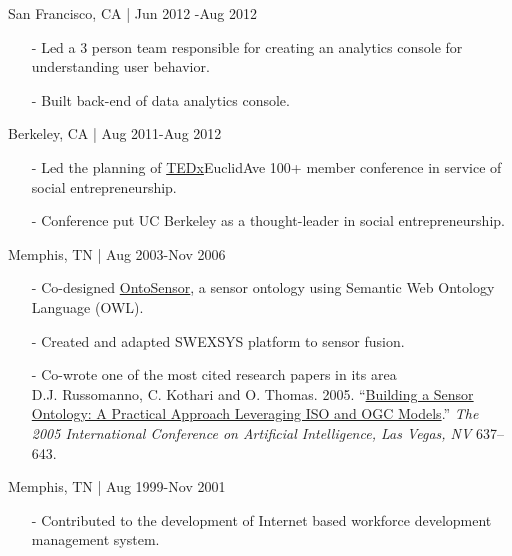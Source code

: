 \documentclass[10pt,article,oneside]{memoir}
\begin{document}
 \hfill San Francisco, CA | Jun 2012 -Aug 2012
\begin{itemize}[noitemsep,nolistsep]
\item[-]Led a 3 person team responsible for creating an analytics console for understanding user behavior.
\item[-]Built back-end of data analytics console.
\end{itemize} 

 \hfill Berkeley, CA | Aug 2011-Aug 2012
\begin{itemize}[noitemsep,nolistsep]
\item[-]Led the planning of \href{http://www.ted.com/tedx/events/3790}{TEDx}EuclidAve 100+ member conference in service of social entrepreneurship.
\item[-] Conference put UC Berkeley as a thought-leader in social entrepreneurship.
\end{itemize} 

 \hfill Memphis, TN | Aug 2003-Nov 2006
\begin{itemize}[noitemsep,nolistsep]
\item[-]Co-designed \href{https://scholar.google.com/scholar?hl=en&q=Building+a+Sensor+Ontology\%3A+A+Practical+Approach+Leveraging+ISO+and+OGC+Models.&btnG=&as_sdt=1\%2C43&as_sdtp=}{OntoSensor}, a sensor ontology using Semantic Web Ontology Language (OWL).
\item[-]Created and adapted SWEXSYS platform to sensor fusion.
\item[-]Co-wrote one of the most cited research papers in its area\\
\ind D.J. Russomanno, C. Kothari and O. Thomas. 2005. ``\href{https://scholar.google.com/citations?view_op=view_citation&hl=en&user=E7z_wrwAAAAJ&sortby=pubdate&citation_for_view=E7z_wrwAAAAJ:u5HHmVD_uO8C}{Building a Sensor Ontology: A Practical Approach Leveraging ISO and OGC Models}.'' \emph{The 2005 International Conference on Artificial Intelligence, Las Vegas, NV} 637--643. 
\end{itemize}

 \hfill Memphis, TN | Aug 1999-Nov 2001
\begin{itemize}[noitemsep,nolistsep]
\item[-]Contributed to the development of Internet based workforce development management system.
\end{itemize} 
\end{document}
